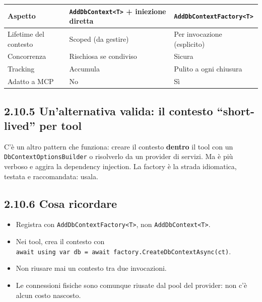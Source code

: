 \documentclass[
  italian,
  10pt,
]{book}
\newcounter{none} %
\providecommand{\tightlist}{%
  \setlength{\itemsep}{0pt}\setlength{\parskip}{0pt}}
\begin{document}
\small

{\def\LTcaptype{none} %
\begin{longtable}[]{@{}
  >{\raggedright\arraybackslash}p{}
  >{\raggedright\arraybackslash}p{}
  >{\raggedright\arraybackslash}p{}@{}}
\toprule\noalign{}
\begin{minipage}[b]{\linewidth}\raggedright
Aspetto
\end{minipage} & \begin{minipage}[b]{\linewidth}\raggedright
\texttt{AddDbContext\textless{}T\textgreater{}} + iniezione diretta
\end{minipage} & \begin{minipage}[b]{\linewidth}\raggedright
\texttt{AddDbContextFactory\textless{}T\textgreater{}}
\end{minipage} \\
\midrule\noalign{}
\endhead
\bottomrule\noalign{}
\endlastfoot
Lifetime del contesto & Scoped (da gestire) & Per invocazione
(esplicito) \\
Concorrenza & Rischiosa se condiviso & Sicura \\
Tracking & Accumula & Pulito a ogni chiusura \\
Adatto a MCP & No & Sì \\
\end{longtable}
}

\normalsize

\subsection{2.10.5 Un'alternativa valida: il contesto ``short-lived''
per tool}\label{unalternativa-valida-il-contesto-short-lived-per-tool}

C'è un altro pattern che funziona: creare il contesto \textbf{dentro} il
tool con un \texttt{DbContextOptionsBuilder} o risolverlo da un provider
di servizi. Ma è più verboso e aggira la dependency injection. La
factory è la strada idiomatica, testata e raccomandata: usala.

\subsection{2.10.6 Cosa ricordare}\label{cosa-ricordare}

\begin{itemize}
\tightlist
\item
  Registra con \texttt{AddDbContextFactory\textless{}T\textgreater{}},
  non \texttt{AddDbContext\textless{}T\textgreater{}}.
\item
  Nei tool, crea il contesto con
  \texttt{await\ using\ var\ db\ =\ await\ factory.CreateDbContextAsync(ct)}.
\item
  Non riusare mai un contesto tra due invocazioni.
\item
  Le connessioni fisiche sono comunque riusate dal pool del provider:
  non c'è alcun costo nascosto.
\end{itemize}
\end{document}
